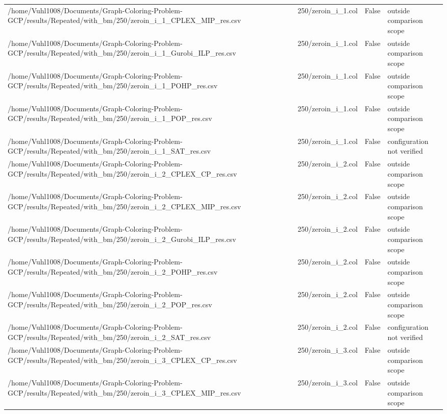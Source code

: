 \begin{table}[htbp]
\begin{tabular}{llll}
/home/Vuhl1008/Documents/Graph-Coloring-Problem-GCP/results/Repeated/with\_bm/250/zeroin\_i\_1\_CPLEX\_MIP\_res.csv & 250/zeroin\_i\_1.col & False & outside comparison scope \\
/home/Vuhl1008/Documents/Graph-Coloring-Problem-GCP/results/Repeated/with\_bm/250/zeroin\_i\_1\_Gurobi\_ILP\_res.csv & 250/zeroin\_i\_1.col & False & outside comparison scope \\
/home/Vuhl1008/Documents/Graph-Coloring-Problem-GCP/results/Repeated/with\_bm/250/zeroin\_i\_1\_POHP\_res.csv & 250/zeroin\_i\_1.col & False & outside comparison scope \\
/home/Vuhl1008/Documents/Graph-Coloring-Problem-GCP/results/Repeated/with\_bm/250/zeroin\_i\_1\_POP\_res.csv & 250/zeroin\_i\_1.col & False & outside comparison scope \\
/home/Vuhl1008/Documents/Graph-Coloring-Problem-GCP/results/Repeated/with\_bm/250/zeroin\_i\_1\_SAT\_res.csv & 250/zeroin\_i\_1.col & False & configuration not verified \\
/home/Vuhl1008/Documents/Graph-Coloring-Problem-GCP/results/Repeated/with\_bm/250/zeroin\_i\_2\_CPLEX\_CP\_res.csv & 250/zeroin\_i\_2.col & False & outside comparison scope \\
/home/Vuhl1008/Documents/Graph-Coloring-Problem-GCP/results/Repeated/with\_bm/250/zeroin\_i\_2\_CPLEX\_MIP\_res.csv & 250/zeroin\_i\_2.col & False & outside comparison scope \\
/home/Vuhl1008/Documents/Graph-Coloring-Problem-GCP/results/Repeated/with\_bm/250/zeroin\_i\_2\_Gurobi\_ILP\_res.csv & 250/zeroin\_i\_2.col & False & outside comparison scope \\
/home/Vuhl1008/Documents/Graph-Coloring-Problem-GCP/results/Repeated/with\_bm/250/zeroin\_i\_2\_POHP\_res.csv & 250/zeroin\_i\_2.col & False & outside comparison scope \\
/home/Vuhl1008/Documents/Graph-Coloring-Problem-GCP/results/Repeated/with\_bm/250/zeroin\_i\_2\_POP\_res.csv & 250/zeroin\_i\_2.col & False & outside comparison scope \\
/home/Vuhl1008/Documents/Graph-Coloring-Problem-GCP/results/Repeated/with\_bm/250/zeroin\_i\_2\_SAT\_res.csv & 250/zeroin\_i\_2.col & False & configuration not verified \\
/home/Vuhl1008/Documents/Graph-Coloring-Problem-GCP/results/Repeated/with\_bm/250/zeroin\_i\_3\_CPLEX\_CP\_res.csv & 250/zeroin\_i\_3.col & False & outside comparison scope \\
/home/Vuhl1008/Documents/Graph-Coloring-Problem-GCP/results/Repeated/with\_bm/250/zeroin\_i\_3\_CPLEX\_MIP\_res.csv & 250/zeroin\_i\_3.col & False & outside comparison scope \\

\end{tabular}
\end{table}
